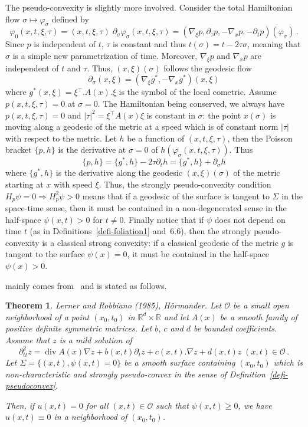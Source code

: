 \documentclass[11pt]{article}
\newtheorem{theo}{Theorem}[section]
\theoremstyle{definition}
\numberwithin{equation}{section}
\numberwithin{figure}{section}
\numberwithin{table}{section}
\newcommand{\RR}{\mathbb{R}}
\newcommand{\Oc}{\mathcal{O}}
\newcommand{\grad}{\nabla}
\renewcommand{\div}{\operatorname{div}}
\newcommand{\trans}{{^{\intercal}}}
\begin{document}
The pseudo-convexity is slightly more involved. Consider the total Hamiltonian flow $\sigma\mapsto\varphi_\sigma$ defined by
\[
\varphi_0(x,t,\xi,\tau)=(x,t,\xi,\tau)\;\partial_\sigma
\varphi_\sigma(x,t,\xi,\tau)=(\grad_\xi p,\partial_\tau
p,-\grad_x p,-\partial_t p)(\varphi_\sigma)\,.
\]
Since $p$ is independent of $t$, $\tau$ is constant and thus $t(\sigma)=t-2\tau\sigma$, meaning that $\sigma$ is a simple new parametrization of time. Moreover, $\grad_\xi p$ and $\grad_x p$ are independent of $t$ and $\tau$. Thus, $(x,\xi)(\sigma)$ follows the geodesic flow
\[
\partial_\sigma (x,\xi)=(\grad_\xi g^*,-\grad_x g^*)(x,\xi)
\]
where $g^{*}(x,\xi)=\xi\trans.A(x).\xi$ is the symbol of the local cometric. Assume $p(x,t,\xi,\tau)=0$ at $\sigma=0$. The Hamiltonian being conserved, we always have $p(x,t,\xi,\tau)=0$ and $|\tau|^2=\xi\trans A(x)\xi$ is constant in $\sigma$: the point $x(\sigma)$ is moving along a geodesic of the metric at a speed which is of constant norm $|\tau|$ with respect to the metric. Let $h$ be a function of $(x,t,\xi,\tau)$, then the Poisson bracket $\{p,h\}$ is the derivative at $\sigma=0$ of $h(\varphi_\sigma(x,t,\xi,\tau))$. Thus
\[
\{p,h\}=\{g^*,h\} -2\tau \partial_t h=\{g^*,h\} + \partial_\sigma h
\]
where $\{g^*,h\}$ is the derivative along the geodesic $(x,\xi)(\sigma)$ of the metric starting at $x$ with speed $\xi$. Thus, the strongly pseudo-convexity condition $H_p\psi=0\Rightarrow H_p^2 \psi>0$ means that if a geodesic of the surface is tangent to $\Sigma$ in the space-time sense, then it must be contained in a non-degenerated sense in the half-space $\psi(x,t)>0$ for $t\neq0$. Finally notice that if $\psi$ does not depend on time $t$ (as in Definitions~\ref{defi-foliation1} and~6.6), then the strongly pseudo-convexity is a classical strong convexity: if a classical geodesic of the metric $g$ is tangent to the surface $\psi(x)=0$, it must be contained in the half-space $\psi(x)>0$.

\cite[Theorem~28.4.3]{Hormander} mainly comes from~\cite{LR} and is stated as follows.

\begin{theo}\label{th-hormander}
\emph{Lerner and Robbiano (1985), H\"ormander.}
Let $\Oc$ be a small open neighborhood of a point $(x_0,t_0)$ in $\RR^d\times
\RR$ and let $A(x)$ be a smooth family of positive definite symmetric matrices. Let $b$, $c$ and $d$ be bounded coefficients. Assume that $z$ is a mild solution of
\begin{equation}\label{eq-LR}
\partial^2_{tt} z=\div A(x)\grad z + b(x,t)\partial_t z+c(x,t).\grad z+d(x,t)z\;(x,t)\in\Oc\,.
\end{equation}
Let $\Sigma=\{(x,t),\psi(x,t)=0\}$ be a smooth surface containing $(x_0,t_0)$ which is non-characteristic and strongly pseudo-convex in the sense of Definition~\ref{defi-pseudoconvex}.

Then, if $u(x,t)=0$ for all $(x,t)\in\Oc$ such that $\psi(x,t)\geq 0$, we have $u(x,t)\equiv 0$ in a neighborhood of $(x_0,t_0)$.
\end{theo}
\end{document}
